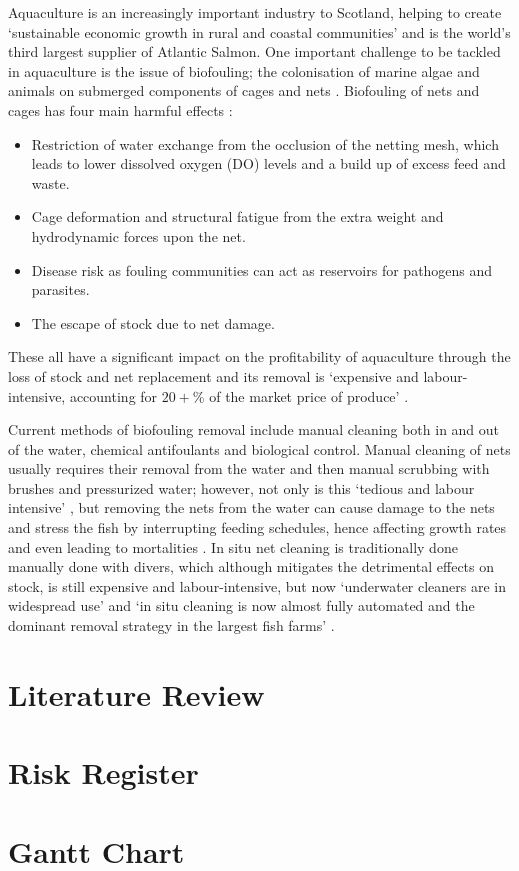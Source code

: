 \documentclass[11.5pt, twoside, a4paper]{article}
\begin{document}
Aquaculture is an increasingly important industry to Scotland, helping to create `sustainable economic growth in rural and coastal communities' \cite{ScotAqua} and is the world's third largest supplier of Atlantic Salmon. One important challenge to be tackled in aquaculture is the issue of biofouling; the colonisation of marine algae and animals on submerged components of cages and nets \cite{fitridge2012impact}. Biofouling of nets and cages has four main harmful effects \cite{fitridge2012impact} \cite{beveridge2008cage} \cite{Crown}:
\begin{itemize}
\item Restriction of water exchange from the occlusion of the netting mesh, which leads to lower dissolved oxygen (DO) levels and a build up of excess feed and waste. 
\item Cage deformation and structural fatigue from the extra weight and hydrodynamic forces upon the net.
\item Disease risk as fouling communities can act as reservoirs for pathogens and parasites.
\item The escape of stock due to net damage.
\end{itemize}
These all have a significant impact on the profitability of aquaculture through the loss of stock and net replacement and its removal is `expensive and labour-intensive, accounting for $20+\%$ of the market price of produce' \cite{Crown}.

Current methods of biofouling removal include manual cleaning both in and out of the water, chemical antifoulants and biological control. Manual cleaning of nets usually requires their removal from the water and then manual scrubbing with brushes and pressurized water; however, not only is this `tedious and labour intensive' \cite{braithwaite2004marine}, but removing the nets from the water can cause damage to the nets and stress the fish by interrupting feeding schedules, hence affecting growth rates and even leading to mortalities \cite{Crown}. In situ net cleaning is traditionally done manually done with divers, which although mitigates the detrimental effects on stock, is still expensive and labour-intensive, but now `underwater cleaners are in widespread use' and `in situ cleaning is now almost fully automated and the dominant removal strategy in the largest fish farms' \cite{fitridge2012impact}. 












\section{Literature Review}

\section{Risk Register}

\section{Gantt Chart}


{}
\end{document}

